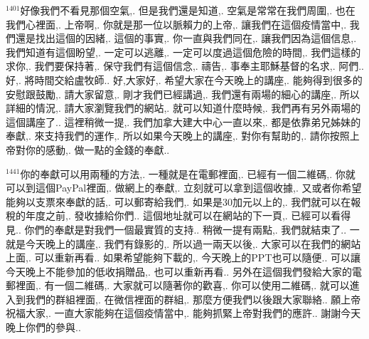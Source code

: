 \documentclass{book}
\begin{document}
$^{1401}$好像我們不看見那個空氣,.
但是我們還是知道,.
空氣是常常在我們周圍,.
也在我們心裡面,.
上帝啊,.
你就是那一位以脈賴力的上帝,.
讓我們在這個疫情當中,.
我們還是找出這個的因緒,.
這個的事實,.
你一直與我們同在,.
讓我們因為這個信息,.
我們知道有這個盼望,.
一定可以逃離,.
一定可以度過這個危險的時間,.
我們這樣的求你,.
我們要保持著,.
保守我們有這個信念,.
禱告,.
事奉主耶穌基督的名求,.
阿們..
好,.
將時間交給盧牧師..
好,大家好,.
希望大家在今天晚上的講座,.
能夠得到很多的安慰跟鼓勵,.
請大家留意,.
剛才我們已經講過,.
我們還有兩場的細心的講座,.
所以詳細的情況,.
請大家瀏覽我們的網站,.
就可以知道什麼時候,.
我們再有另外兩場的這個講座了..
這裡稍微一提,.
我們加拿大建大中心一直以來,.
都是依靠弟兄姊妹的奉獻,.
來支持我們的運作,.
所以如果今天晚上的講座,.
對你有幫助的,.
請你按照上帝對你的感動,.
做一點的金錢的奉獻..

$^{1441}$你的奉獻可以用兩種的方法,.
一種就是在電郵裡面,.
已經有一個二維碼,.
你就可以到這個PayPal裡面,.
做網上的奉獻,.
立刻就可以拿到這個收據,.
又或者你希望能夠以支票來奉獻的話,.
可以郵寄給我們,.
如果是30加元以上的,.
我們就可以在報稅的年度之前,.
發收據給你們..
這個地址就可以在網站的下一頁,.
已經可以看得見..
你們的奉獻是對我們一個最實質的支持..
稍微一提有兩點,.
我們就結束了..
一就是今天晚上的講座,.
我們有錄影的,.
所以過一兩天以後,.
大家可以在我們的網站上面,.
可以重新再看..
如果希望能夠下載的,.
今天晚上的PPT也可以隨便..
可以讓今天晚上不能參加的低收捐贈品,.
也可以重新再看..
另外在這個我們發給大家的電郵裡面,.
有一個二維碼,.
大家就可以隨著你的歡喜,.
你可以使用二維碼,.
就可以進入到我們的群組裡面,.
在微信裡面的群組,.
那麼方便我們以後跟大家聯絡..
願上帝祝福大家,.
一直大家能夠在這個疫情當中,.
能夠抓緊上帝對我們的應許..
謝謝今天晚上你們的參與..
\newpage
\end{document}
